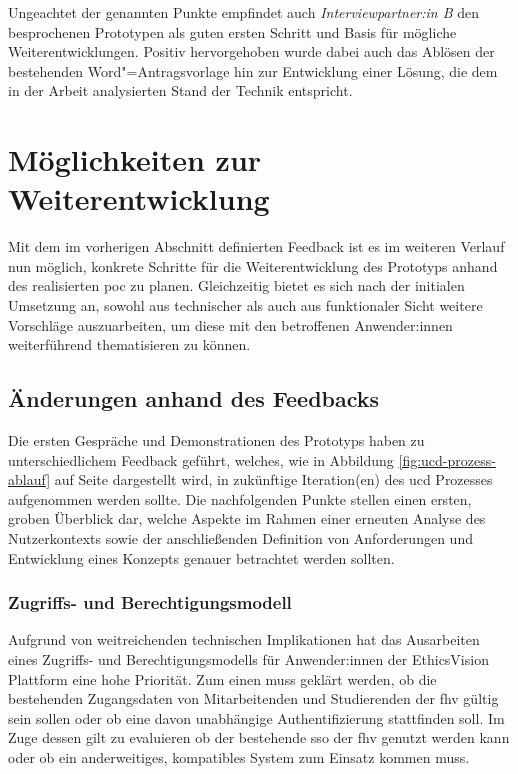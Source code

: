 \documentclass[a4paper,12pt,twoside,numbers=noendperiod]{scrreprt}
\begin{document}
Ungeachtet der genannten Punkte empfindet auch \textit{Interviewpartner:in B} den besprochenen Prototypen als guten ersten Schritt und Basis für mögliche Weiterentwicklungen. Positiv hervorgehoben wurde dabei auch das Ablösen der bestehenden Word"=Antragsvorlage hin zur Entwicklung einer Lösung, die dem in der Arbeit analysierten Stand der Technik entspricht.

\section{Möglichkeiten zur Weiterentwicklung}
\label{sec:möglichkeiten-weiterentwicklung}

Mit dem im vorherigen Abschnitt definierten Feedback ist es im weiteren Verlauf nun möglich, konkrete Schritte für die Weiterentwicklung des Prototyps anhand des realisierten \ac{poc} zu planen. Gleichzeitig bietet es sich nach der initialen Umsetzung an, sowohl aus technischer als auch aus funktionaler Sicht weitere Vorschläge auszuarbeiten, um diese mit den betroffenen Anwender:innen weiterführend thematisieren zu können.

\subsection{Änderungen anhand des Feedbacks}
\label{sub-sec:änderung-anhand-feedback}

Die ersten Gespräche und Demonstrationen des Prototyps haben zu unterschiedlichem Feedback geführt, welches, wie in Abbildung \ref{fig:ucd-prozess-ablauf} auf Seite \pageref{fig:ucd-prozess-ablauf} dargestellt wird, in zukünftige Iteration(en) des \acl{ucd} Prozesses aufgenommen werden sollte. Die nachfolgenden Punkte stellen einen ersten, groben Überblick dar, welche Aspekte im Rahmen einer erneuten Analyse des Nutzerkontexts sowie der anschließenden Definition von Anforderungen und Entwicklung eines Konzepts genauer betrachtet werden sollten.

\subsubsection*{Zugriffs- und Berechtigungsmodell}
\label{sub-sub-sec:zugriffs-berechtigungsmodell}

Aufgrund von weitreichenden technischen Implikationen hat das Ausarbeiten eines Zugriffs- und Berechtigungsmodells für Anwender:innen der EthicsVision Plattform eine hohe Priorität. Zum einen muss geklärt werden, ob die bestehenden Zugangsdaten von Mitarbeitenden und Studierenden der \ac{fhv} gültig sein sollen oder ob eine davon unabhängige Authentifizierung stattfinden soll. Im Zuge dessen gilt zu evaluieren ob der bestehende \ac{sso} der \acl{fhv} genutzt werden kann oder ob ein anderweitiges, kompatibles System zum Einsatz kommen muss.
\end{document}
